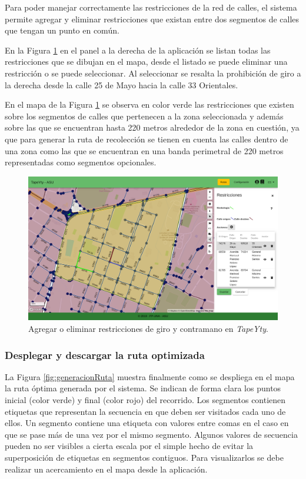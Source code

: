 Para poder manejar correctamente las restricciones de la red de calles, el sistema permite agregar y eliminar restricciones que existan entre dos segmentos de calles que tengan un punto en común. 

En la Figura \ref{fig:restriccion} en el panel a la derecha de la aplicación se listan todas las restricciones que se dibujan en el mapa, desde el listado se puede eliminar una restricción o se puede seleccionar. Al seleccionar se resalta la prohibición de giro a la derecha desde la calle 25 de Mayo hacia la calle 33 Orientales.

En el mapa de la Figura \ref{fig:restriccion} se observa en color verde las restricciones que existen sobre los segmentos de calles que pertenecen a la zona seleccionada y además sobre las que se encuentran hasta 220 metros alrededor de la zona en cuestión, ya que para generar la ruta de recolección se tienen en cuenta las calles dentro de una zona como las que se encuentran en una banda perimetral de 220 metros representadas como segmentos opcionales.

\begin{figure}[H]
\centerline{\includegraphics[width=\textwidth]{restricciones.png}}
\caption{Agregar o eliminar restricciones de giro y contramano en \textit{TapeYty}.}
\label{fig:restriccion}
\end{figure}

\subsubsection{Desplegar y descargar la ruta optimizada}

La Figura \ref{fig:generacionRuta} muestra finalmente como se despliega en el mapa la ruta óptima generada por el sistema. Se indican de forma clara los puntos inicial (color verde) y final (color rojo) del recorrido. Los segmentos contienen etiquetas que representan la secuencia en que deben ser visitados cada uno de ellos. Un segmento contiene una etiqueta con valores entre comas en el caso en que se pase más de una vez por el mismo segmento. Algunos valores de secuencia pueden no ser visibles a cierta escala por el simple hecho de evitar la superposición de etiquetas en segmentos contiguos. Para visualizarlos se debe realizar un acercamiento en el mapa desde la aplicación.

